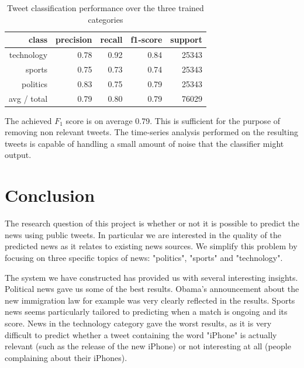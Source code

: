 \documentclass{llncs}
\begin{document}
\begin{table}[H]
	\begin{center}
		\begin{tabular}{|r|r|r|r|r|} \hline
			class  & precision   & recall & f1-score  & support \\ \hline
			technology    &   0.78 &     0.92  &    0.84   &  25343 \\
			sports   &    0.75   &   0.73   &   0.74   &   25343 \\
			politics   &    0.83  &    0.75   &   0.79   &   25343 \\
			avg / total  &     0.79   &   0.80  &    0.79   &  76029 \\ \hline
		\end{tabular}
	\end{center}
	\caption{Tweet classification performance over the three trained categories}
	\label{tbl:newclassifier}
\end{table}

The achieved $F_1$ score is on average 0.79. This is sufficient for the purpose of removing non relevant tweets. The time-series analysis performed on the resulting tweets is capable of handling a small amount of noise that the classifier might output.

\section{Conclusion}
The research question of this project is whether or not it is possible to predict the news using public tweets. In particular we are interested in the quality of the predicted news as it relates to existing news sources. We simplify this problem by focusing on three specific topics of news: "politics", "sports" and "technology".

The system we have constructed has provided us with several interesting insights. Political news gave us some of the best results. Obama's announcement about the new immigration law for example was very clearly reflected in the results. Sports news seems particularly tailored to predicting when a match is ongoing and its score. News in the technology category gave the worst results, as it is very difficult to predict whether a tweet containing the word "iPhone" is actually relevant (such as the release of the new iPhone) or not interesting at all (people complaining about their iPhones).
\end{document}
